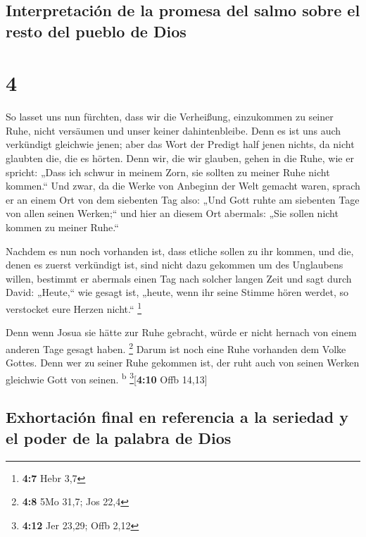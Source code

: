 \hypertarget{interpretaciuxf3n-de-la-promesa-del-salmo-sobre-el-resto-del-pueblo-de-dios}{%
\subsection{Interpretación de la promesa del salmo sobre el resto del
pueblo de
Dios}\label{interpretaciuxf3n-de-la-promesa-del-salmo-sobre-el-resto-del-pueblo-de-dios}}

\hypertarget{section-3}{%
\section{4}\label{section-3}}

 So lasset uns nun fürchten, dass wir die Verheißung,
einzukommen zu seiner Ruhe, nicht versäumen und unser keiner
dahintenbleibe.  Denn es ist uns auch verkündigt gleichwie
jenen; aber das Wort der Predigt half jenen nichts, da nicht glaubten
die, die es hörten.  Denn wir, die wir glauben, gehen in
die Ruhe, wie er spricht: „Dass ich schwur in meinem Zorn, sie sollten
zu meiner Ruhe nicht kommen.`` Und zwar, da die Werke von Anbeginn der
Welt gemacht waren,  sprach er an einem Ort von dem
siebenten Tag also: „Und Gott ruhte am siebenten Tage von allen seinen
Werken;``  und hier an diesem Ort abermals: „Sie sollen
nicht kommen zu meiner Ruhe.``

 Nachdem es nun noch vorhanden ist, dass etliche sollen zu
ihr kommen, und die, denen es zuerst verkündigt ist, sind nicht dazu
gekommen um des Unglaubens willen,  bestimmt er abermals
einen Tag nach solcher langen Zeit und sagt durch David: „Heute,`` wie
gesagt ist, „heute, wenn ihr seine Stimme hören werdet, so verstocket
eure Herzen nicht.`` \footnote{\textbf{4:7} Hebr 3,7}

 Denn wenn Josua sie hätte zur Ruhe gebracht, würde er
nicht hernach von einem anderen Tage gesagt haben. \footnote{\textbf{4:8}
  5Mo 31,7; Jos 22,4}  Darum ist noch eine Ruhe vorhanden
dem Volke Gottes.  Denn wer zu seiner Ruhe gekommen ist,
der ruht auch von seinen Werken gleichwie Gott von seinen.
\textsuperscript{b} \footnote{\textbf{4:12} Jer 23,29; Offb 2,12}{[}\textbf{4:10}
Offb 14,13{]}

\hypertarget{exhortaciuxf3n-final-en-referencia-a-la-seriedad-y-el-poder-de-la-palabra-de-dios}{%
\subsection{Exhortación final en referencia a la seriedad y el poder de
la palabra de
Dios}\label{exhortaciuxf3n-final-en-referencia-a-la-seriedad-y-el-poder-de-la-palabra-de-dios}}

